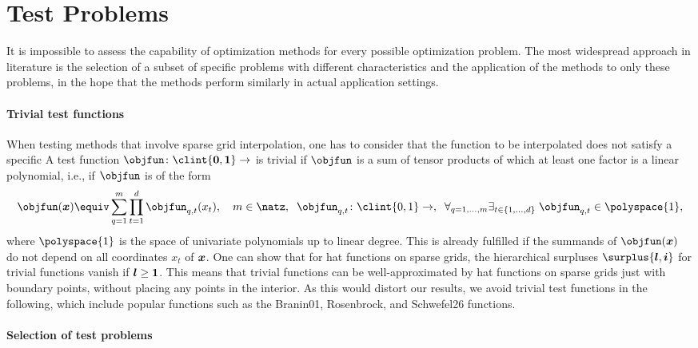 \section{Test Problems}
\label{sec:53testProblems}

It is impossible to assess the capability of optimization methods
for every possible optimization problem.
The most widespread approach in literature
is the selection of a subset of specific problems
with different characteristics  and
the application of the methods to only these problems,
in the hope that the methods perform similarly in
actual application settings.

\paragraph{Trivial test functions}

When testing methods that involve sparse grid interpolation,
one has to consider that the function to be interpolated
does not satisfy a specific 
A test function $\objfun\colon \clint{\*0, \*1} \to \real$ is trivial if
$\objfun$ is a sum of tensor products of which at
least one factor is a linear polynomial, i.e., if
$\objfun$ is of the form
{%
  \setlength{\abovedisplayskip}{9pt}%
  \setlength{\belowdisplayskip}{9pt}%
  \begin{equation}
    \objfun(\*x) \equiv \sum_{q=1}^m \prod_{t=1}^d \objfun_{q,t}(x_t),\quad
    m \in \natz,\;\;
    \objfun_{q,t}\colon \clint{0, 1} \to \real,\;\;
    \faex{q = 1, \dotsc, m}{t \in \{1, \dotsc, d\}}{
      \objfun_{q,t} \in \polyspace{1},
    }
  \end{equation}%
}%
where $\polyspace{1}$ is the space of univariate polynomials
up to linear degree.
This is already fulfilled if the summands of $\objfun(\*x)$
do not depend on all coordinates $x_t$ of ${\boldsymbol{x}}$.
One can show that for hat functions on sparse grids,
the hierarchical surpluses $\surplus{\*l,\*i}$ for trivial functions
vanish if ${\boldsymbol{l}} \ge {\boldsymbol{1}}$.
This means that trivial functions can be well-approximated by hat functions
on sparse grids just with boundary points, without placing any points
in the interior.
As this would distort our results,
we avoid trivial test functions in the following,
which include popular functions such as the
Branin01, Rosenbrock, and Schwefel26 functions.

\paragraph{Selection of test problems}

